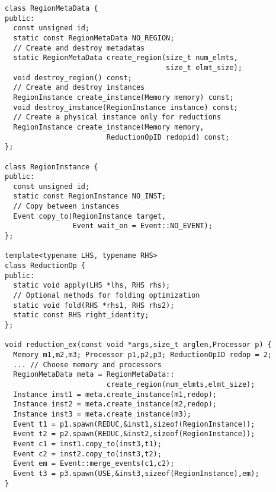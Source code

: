 \begin{lstlisting}[float={t},label={lst:regionapi},caption={Physical Region Interface and Example.}]
class RegionMetaData {
public:
  const unsigned id;
  static const RegionMetaData NO_REGION;
  // Create and destroy metadatas
  static RegionMetaData create_region(size_t num_elmts, 
                                      size_t elmt_size);
  void destroy_region() const;
  // Create and destroy instances
  RegionInstance create_instance(Memory memory) const;
  void destroy_instance(RegionInstance instance) const;
  // Create a physical instance only for reductions
  RegionInstance create_instance(Memory memory, 
                        ReductionOpID redopid) const;
};

class RegionInstance {
public:
  const unsigned id;
  static const RegionInstance NO_INST;
  // Copy between instances
  Event copy_to(RegionInstance target, 
                Event wait_on = Event::NO_EVENT);
};

template<typename LHS, typename RHS>
class ReductionOp {
public:
  static void apply(LHS *lhs, RHS rhs);
  // Optional methods for folding optimization
  static void fold(RHS *rhs1, RHS rhs2);
  static const RHS right_identity;
};

void reduction_ex(const void *args,size_t arglen,Processor p) {
  Memory m1,m2,m3; Processor p1,p2,p3; ReductionOpID redop = 2;
  ... // Choose memory and processors
  RegionMetaData meta = RegionMetaData::
                        create_region(num_elmts,elmt_size);
  Instance inst1 = meta.create_instance(m1,redop);
  Instance inst2 = meta.create_instance(m2,redop);
  Instance inst3 = meta.create_instance(m3);
  Event t1 = p1.spawn(REDUC,&inst1,sizeof(RegionInstance));
  Event t2 = p2.spawn(REDUC,&inst2,sizeof(RegionInstance));
  Event c1 = inst1.copy_to(inst3,t1);
  Event c2 = inst2.copy_to(inst3,t2);
  Event em = Event::merge_events(c1,c2);
  Event t3 = p3.spawn(USE,&inst3,sizeof(RegionInstance),em);
}
\end{lstlisting}


